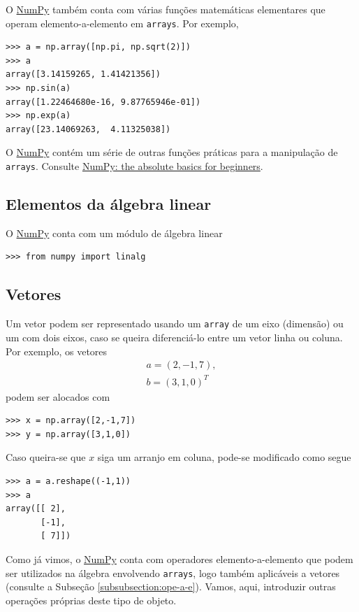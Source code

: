 \documentclass[12pt]{article}
\begin{document}
O \href{https://numpy.org/}{NumPy} também conta com várias funções matemáticas elementares que operam elemento-a-elemento em \lstinline+arrays+. Por exemplo,
\begin{lstlisting}
>>> a = np.array([np.pi, np.sqrt(2)])
>>> a
array([3.14159265, 1.41421356])
>>> np.sin(a)
array([1.22464680e-16, 9.87765946e-01])
>>> np.exp(a)
array([23.14069263,  4.11325038])
\end{lstlisting}
 
\begin{obs}
O \href{https://numpy.org/}{NumPy} contém um série de outras funções práticas para a manipulação de \lstinline+arrays+. Consulte \href{https://numpy.org/doc/stable/user/absolute_beginners.html\#numpy-the-absolute-basics-for-beginners}{NumPy: the absolute basics for beginners}.  
\end{obs}

\subsection{Elementos da álgebra linear}

O \href{https://numpy.org/}{NumPy} conta com um módulo de álgebra linear
\begin{lstlisting}
>>> from numpy import linalg
\end{lstlisting}

\subsection{Vetores}

Um vetor podem ser representado usando um \lstinline+array+ de um eixo (dimensão) ou um com dois eixos, caso se queira diferenciá-lo entre um vetor linha ou coluna. Por exemplo, os vetores
\begin{gather}
  a = (2, -1, 7),\\
  b = (3, 1, 0)^T
\end{gather}
podem ser alocados com
\begin{lstlisting}
>>> x = np.array([2,-1,7])
>>> y = np.array([3,1,0])
\end{lstlisting}
Caso queira-se que $x$ siga um arranjo em coluna, pode-se modificado como segue
\begin{lstlisting}
>>> a = a.reshape((-1,1))
>>> a
array([[ 2],
       [-1],
       [ 7]])
\end{lstlisting}

Como já vimos, o \href{https://numpy.org/}{NumPy} conta com operadores elemento-a-elemento que podem ser utilizados na álgebra envolvendo \lstinline+arrays+, logo também aplicáveis a vetores (consulte a Subseção \ref{subsubsection:ope-a-e}). Vamos, aqui, introduzir outras operações próprias deste tipo de objeto.
\end{document}
